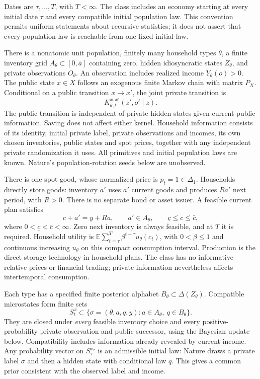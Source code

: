 \documentclass[11pt]{article}
\newcommand{\E}{\mathbb E}
\begin{document}
Dates are $\tau,\ldots,T$, with $T<\infty$. The class includes an economy starting at every initial date $\tau$ and every compatible initial population law. This convention permits uniform statements about recursive statistics; it does not assert that every population law is reachable from one fixed initial law.

There is a nonatomic unit population, finitely many household types $\theta$, a finite inventory grid $A_\theta\subset[0,\bar a]$ containing zero, hidden idiosyncratic states $Z_\theta$, and private observations $O_\theta$. An observation includes realized income $Y_\theta(o)>0$. The public state $x\in X$ follows an exogenous finite Markov chain with matrix $P_X$. Conditional on a public transition $x\to x'$, the joint private transition is
\[
 K_{\theta,t}^{x,x'}(z',o'\mid z).
\]
The public transition is independent of private hidden states given current public information. Saving does not affect either kernel. Household information consists of its identity, initial private label, private observations and incomes, its own chosen inventories, public states and spot prices, together with any independent private randomization it uses. All primitives and initial population laws are known. Nature's population-rotation seeds below are unobserved.

There is one spot good, whose normalized price is $p_t=1\in\Delta_1$. Households directly store goods: inventory $a'$ uses $a'$ current goods and produces $Ra'$ next period, with $R>0$. There is no separate bond or asset issuer. A feasible current plan satisfies
\begin{equation}\label{budget}
 c+a'=y+Ra,\qquad a'\in A_\theta,\qquad
 \underline c\le c\le\bar c,
\end{equation}
where $0<\underline c<\bar c<\infty$. Zero next inventory is always feasible, and at $T$ it is required. Household utility is $\E\sum_{t=\tau}^T\beta^{t-\tau}u_\theta(c_t)$, with $0<\beta\le1$ and continuous increasing $u_\theta$ on this compact consumption interval. Production is the direct storage technology in household plans. The class has no informative relative prices or financial trading; private information nevertheless affects intertemporal consumption.

Each type has a specified finite posterior alphabet $B_\theta\subset\Delta(Z_\theta)$. Compatible microstates form finite sets
\[
 S_t^x\subset\{\sigma=(\theta,a,q,y):a\in A_\theta,\ q\in B_\theta\}.
\]
They are closed under \emph{every} feasible inventory choice and every positive-probability private observation and public successor, using the Bayesian update below. Compatibility includes information already revealed by current income. Any probability vector on $S_\tau^{x_\tau}$ is an admissible initial law: Nature draws a private label $\sigma$ and then a hidden state with conditional law $q$. This gives a common prior consistent with the observed label and income.
\end{document}
